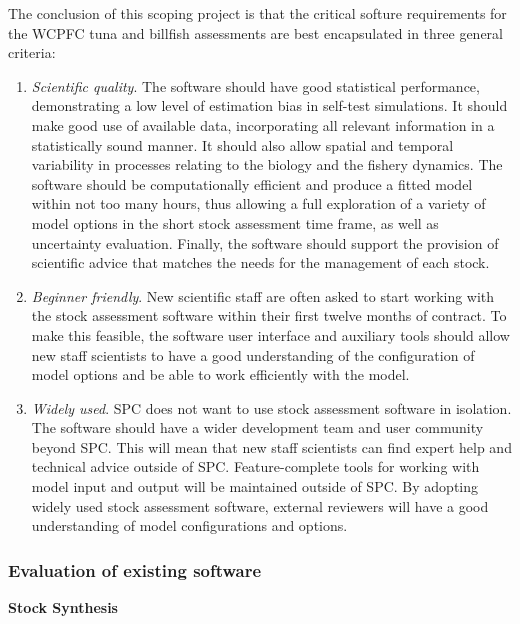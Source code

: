 \documentclass{SCreport}
\begin{document}
The conclusion of this scoping project is that the critical softure requirements
for the WCPFC tuna and billfish assessments are best encapsulated in three
general criteria:

\begin{enumerate}
  \item \textit{Scientific quality}. The software should have good statistical
  performance, demonstrating a low level of estimation bias in self-test
  simulations. It should make good use of available data, incorporating all
  relevant information in a statistically sound manner. It should also allow
  spatial and temporal variability in processes relating to the biology and the
  fishery dynamics. The software should be computationally efficient and produce
  a fitted model within not too many hours, thus allowing a full exploration of
  a variety of model options in the short stock assessment time frame, as well
  as uncertainty evaluation. Finally, the software should support the provision
  of scientific advice that matches the needs for the management of each stock.
  \item \textit{Beginner friendly}. New scientific staff are often asked to
  start working with the stock assessment software within their first twelve
  months of contract. To make this feasible, the software user interface and
  auxiliary tools should allow new staff scientists to have a good understanding
  of the configuration of model options and be able to work efficiently with the
  model.
  \item \textit{Widely used}. SPC does not want to use stock assessment software
  in isolation. The software should have a wider development team and user
  community beyond SPC. This will mean that new staff scientists can find expert
  help and technical advice outside of SPC. Feature-complete tools for working
  with model input and output will be maintained outside of SPC. By adopting
  widely used stock assessment software, external reviewers will have a good
  understanding of model configurations and options.
\end{enumerate}

\vspace{1ex}

\subsubsection{Evaluation of existing software}

\textbf{Stock Synthesis}
\label{sec:ss-software-evaluation}
\end{document}
